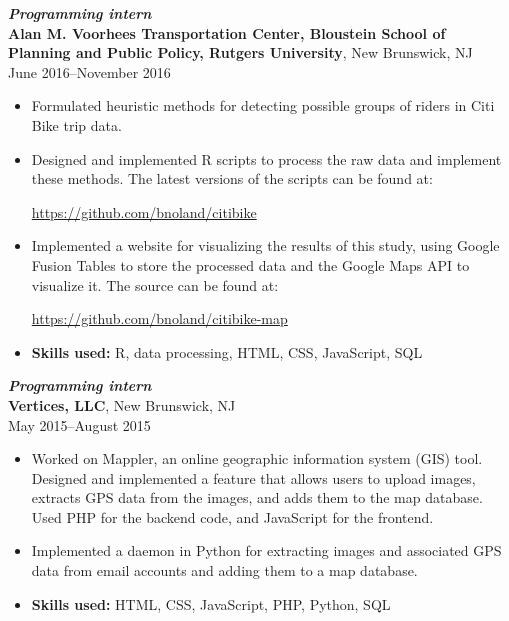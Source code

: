 \documentclass[letterpaper,12pt]{article}
\begin{document}
\textit{\textbf{Programming intern}} \\
\textbf{Alan M. Voorhees Transportation Center, Bloustein School of
  Planning and Public Policy, Rutgers University},
New Brunswick, NJ \\
June 2016--November 2016
\begin{itemize}
\item Formulated heuristic methods for detecting possible groups of
  riders in Citi Bike trip data.
\item Designed and implemented R scripts to process the raw data and
  implement these methods. The latest versions of the scripts can be
  found at:
  \begin{center}
    \url{https://github.com/bnoland/citibike}
  \end{center}

\item Implemented a website for visualizing the results of this study,
  using Google Fusion Tables to store the processed data and the
  Google Maps API to visualize it. The source can be found at:
  \begin{center}
    \url{https://github.com/bnoland/citibike-map}
  \end{center}

\item \textbf{Skills used:} R, data processing, HTML, CSS, JavaScript,
  SQL
\end{itemize}

\textit{\textbf{Programming intern}} \\
\textbf{Vertices, LLC}, New Brunswick, NJ \\
May 2015--August 2015
\begin{itemize}
\item Worked on Mappler, an online geographic information system (GIS)
  tool. Designed and implemented a feature that allows users to upload
  images, extracts GPS data from the images, and adds them to the map
  database. Used PHP for the backend code, and JavaScript for the
  frontend.
\item Implemented a daemon in Python for extracting images and
  associated GPS data from email accounts and adding them to a map
  database.
\item \textbf{Skills used:} HTML, CSS, JavaScript, PHP, Python, SQL
\end{itemize}
\end{document}
